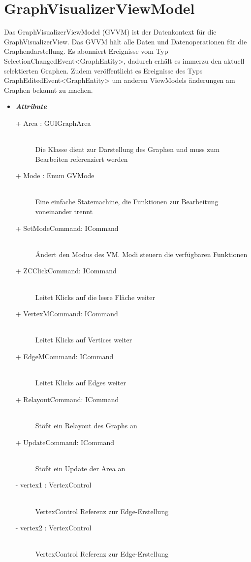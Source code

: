 \documentclass[13pt]{scrreprt}
\begin{document}
	\section{GraphVisualizerViewModel}
	Das GraphVisualizerViewModel (GVVM) ist der Datenkontext für die GraphVisualizerView. Das GVVM h\"alt alle Daten und Datenoperationen für die Graphendarstellung. Es abonniert Ereignisse vom Typ SelectionChangedEvent<GraphEntity>, dadurch erh\"alt es immerzu den aktuell selektierten Graphen. Zudem ver\"offentlicht es Ereignisse des Typs GraphEditedEvent<GraphEntity> um anderen ViewModels \"anderungen am Graphen bekannt zu machen.
	\newpage
	\begin{itemize}[label = {$\circ$}]
		\item {\large \textbf{\textit{Attribute}}\par}
		\begin{description}
			\item [+ Area : GUIGraphArea] \hfill \\ Die Klasse dient zur Darstellung des Graphen und muss zum Bearbeiten referenziert werden
			\item [+ Mode : Enum GVMode] \hfill \\ Eine einfache Statemachine, die Funktionen zur Bearbeitung voneinander trennt
			\item [+ SetModeCommand: ICommand]\hfill \\ Ändert den Modus des VM. Modi steuern die verfügbaren Funktionen
			\item [+ ZCClickCommand: ICommand]\hfill \\ Leitet Klicks auf die leere Fl\"ache weiter
			\item [+ VertexMCommand: ICommand]\hfill \\ Leitet Klicks auf Vertices weiter
			\item [+ EdgeMCommand: ICommand]\hfill \\ Leitet Klicks auf Edges weiter
			\item [+ RelayoutCommand: ICommand]\hfill \\ Stößt ein Relayout des Graphs an
			\item [+ UpdateCommand: ICommand]\hfill \\ Stößt ein Update der Area an
			\item [- vertex1 : VertexControl] \hfill \\ VertexControl Referenz zur Edge-Erstellung
			\item [- vertex2 : VertexControl] \hfill \\ VertexControl Referenz zur Edge-Erstellung

\end{description}
\end{itemize}
\end{document}

